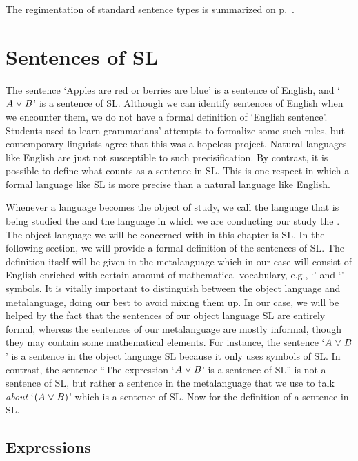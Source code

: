 The regimentation of standard sentence types is summarized on p.~\pageref{app.notation}.





\section{Sentences of SL}
\label{sec:sentencesofSL}

The sentence `Apples are red or berries are blue' is a sentence of English, and `$A\mkern1mu\vee\mkern1mu B$' is a sentence of SL.
Although we can identify sentences of English when we encounter them, we do not have a formal definition of `English sentence'.
Students used to learn grammarians' attempts to formalize some such rules, but contemporary linguists agree that this was a hopeless project.
Natural languages like English are just not susceptible to such precisification.
By contrast, it is possible to define what counts as a sentence in SL.
This is one respect in which a formal language like SL is more precise than a natural language like English.

Whenever a language becomes the object of study, we call the language that is being studied the  and the language in which we are conducting our study the . \label{def.metalanguage}
The object language we will be concerned with in this chapter is SL.
In the following section, we will provide a formal definition of the sentences of SL. 
The definition itself will be given in the metalanguage which in our case will consist of English enriched with certain amount of mathematical vocabulary, e.g., `\metaA{}' and `\metaB{}' symbols.
It is vitally important to distinguish between the object language and metalanguage, doing our best to avoid mixing them up.
In our case, we will be helped by the fact that the sentences of our object language SL are entirely formal, whereas the sentences of our metalanguage are mostly informal, though they may contain some mathematical elements.
For instance, the sentence `$A\mkern1mu\vee\mkern1mu B$' is a sentence in the object language SL because it only uses symbols of SL. 
In contrast, the sentence ``The expression `$A\mkern1mu\vee\mkern1mu B$' is a sentence of SL'' is not a sentence of SL, but rather a sentence in the metalanguage that we use to talk \emph{about} `$(A\mkern1mu\vee\mkern1mu B)$' which is a sentence of SL.
Now for the definition of a sentence in SL.


\subsection{Expressions}

